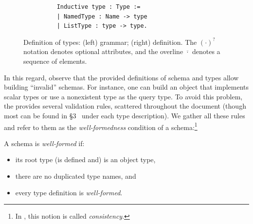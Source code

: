 \begin{figure}[h]
\begin{subfigure}{.5\textwidth}
\begin{verbatim}
    Inductive type : Type :=
    | NamedType : Name -> type
    | ListType : type -> type.
    \end{verbatim}

    \end{subfigure}
    \caption{Definition of \gql types: (left) \spec grammar; 
    (right) \gcoql definition.\newline
    {\footnotesize The $(\cdot)^{?}$ notation denotes optional attributes, and the overline $\overline{\cdot}$ denotes a sequence of elements.} 
    }
    \label{fig:types_def}
\end{figure}




In this regard, observe that the provided definitions of schema and types allow building ``invalid'' schemas. For instance, one can build an object that implements scalar types or use a nonexistent type as the query type. To avoid this problem, the \spec provides several validation rules, scattered throughout the document (though most can be found in \S3~\cite{gqlspec} under each type description).
 We gather all these rules and refer to them as the \textit{well-formedness}
condition of a \gql schema:\footnote{In \HP, this notion is called {\em consistency}.}

\begin{definition}
A \gql schema is \textit{well-formed} if: 
\begin{itemize}
    \item its root type (is defined and) is an object type, 
    \item there are no duplicated type names, and
    \item every type definition is \textit{well-formed}.
\end{itemize}
\end{definition}

